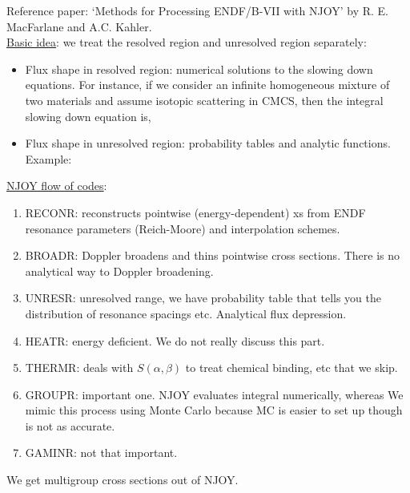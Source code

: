 \documentclass{school-22.211-notes}
\date{February 27, 2012}
\begin{document}
\maketitle

Reference paper: `Methods for Processing ENDF/B-VII with NJOY' by R. E. MacFarlane and A.C. Kahler. \\
\uline{Basic idea}: we treat the resolved region and unresolved region separately: 
\begin{itemize}
\item Flux shape in resolved region: numerical solutions to the slowing down equations. For instance, if we consider an infinite homogeneous mixture of two materials and assume isotopic scattering in CMCS, then the integral slowing down equation is, 
\item Flux shape in unresolved region: probability tables and analytic functions. Example: 
\end{itemize}
\uline{NJOY flow of codes}:
\begin{enumerate}
\item RECONR: reconstructs pointwise (energy-dependent) xs from ENDF resonance parameters (Reich-Moore) and interpolation schemes. 
\item BROADR: Doppler broadens and thins pointwise cross sections. There is no analytical way to Doppler broadening. 
\item UNRESR: unresolved range, we have probability table that tells you the distribution of resonance spacings etc. Analytical flux depression. 
\item HEATR: energy deficient. We do not really discuss this part. 
\item THERMR: deals with $S(\alpha, \beta)$ to treat chemical binding, etc that we skip.
\item GROUPR: important one. NJOY evaluates integral numerically, whereas We mimic this process using Monte Carlo because MC is easier to set up though is not as accurate. 
\item GAMINR: not that important. 
\end{enumerate}
We get multigroup cross sections out of NJOY. 
\end{document}
